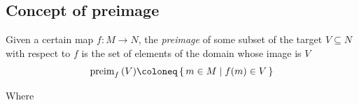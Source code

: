   \subsection{Concept of preimage}
  Given a certain map $f:M\longrightarrow N$, the \emph{preimage} of some
  subset of the target $V\subseteq N$ with respect to $f$ is the set of
  elements of the domain whose image is $V$
  \[
    \text{preim}_f\,(V) \coloneq \set{m\in M | f(m)\in V}
  \]

  Where
  \begin{center}
  \end{center}
  
